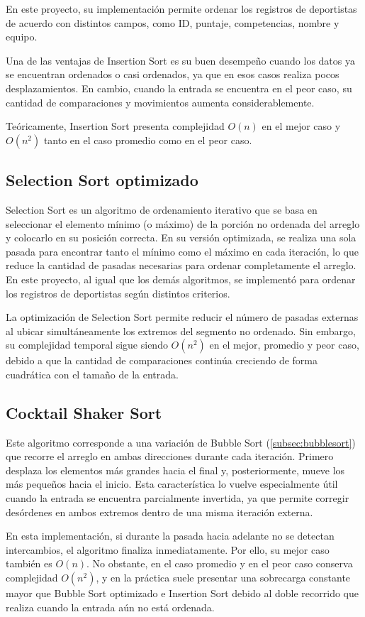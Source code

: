 En este proyecto, su implementación permite ordenar los registros de deportistas de acuerdo con distintos campos, como ID, puntaje, competencias, nombre y equipo.

Una de las ventajas de Insertion Sort es su buen desempeño cuando los datos ya se encuentran ordenados o casi ordenados, ya que en esos casos realiza pocos desplazamientos. En cambio, cuando la entrada se encuentra en el peor caso, su cantidad de comparaciones y movimientos aumenta considerablemente.

Teóricamente, Insertion Sort presenta complejidad \(O(n)\) en el mejor caso y \(O(n^2)\) tanto en el caso promedio como en el peor caso.

\subsection{Selection Sort optimizado}
Selection Sort es un algoritmo de ordenamiento iterativo que se basa en seleccionar el elemento mínimo (o máximo) de la porción no ordenada del arreglo y colocarlo en su posición correcta. En su versión optimizada, se realiza una sola pasada para encontrar tanto el mínimo como el máximo en cada iteración, lo que reduce la cantidad de pasadas necesarias para ordenar completamente el arreglo.
En este proyecto, al igual que los demás algoritmos, se implementó para ordenar los registros de deportistas según distintos criterios.

La optimización de Selection Sort permite reducir el número de pasadas externas al ubicar simultáneamente los extremos del segmento no ordenado. Sin embargo, su complejidad temporal sigue siendo \(O(n^2)\) en el mejor, promedio y peor caso, debido a que la cantidad de comparaciones continúa creciendo de forma cuadrática con el tamaño de la entrada.

\subsection{Cocktail Shaker Sort}
Este algoritmo corresponde a una variación de Bubble Sort (\ref{subsec:bubblesort}) que recorre el arreglo en ambas direcciones durante cada iteración. Primero desplaza los elementos más grandes hacia el final y, posteriormente, mueve los más pequeños hacia el inicio. Esta característica lo vuelve especialmente útil cuando la entrada se encuentra parcialmente invertida, ya que permite corregir desórdenes en ambos extremos dentro de una misma iteración externa.

En esta implementación, si durante la pasada hacia adelante no se detectan intercambios, el algoritmo finaliza inmediatamente. Por ello, su mejor caso también es \(O(n)\). No obstante, en el caso promedio y en el peor caso conserva complejidad \(O(n^2)\), y en la práctica suele presentar una sobrecarga constante mayor que Bubble Sort optimizado e Insertion Sort debido al doble recorrido que realiza cuando la entrada aún no está ordenada.

